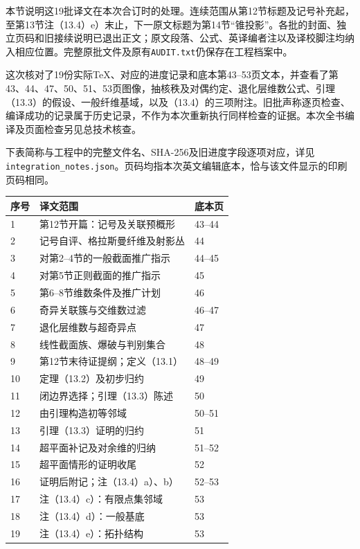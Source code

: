 本节说明这19批译文在本次合订时的处理。连续范围从第12节标题及记号补充起，至第13节注（13.4）e）末止，下一原文标题为第14节“锥投影”。各批的封面、独立页码和旧接续说明已退出正文；原文段落、公式、英译编者注以及译校脚注均纳入相应位置。完整原批文件及原有\texttt{AUDIT.txt}仍保存在工程档案中。

这次核对了19份实际TeX、对应的进度记录和底本第43--53页文本，并查看了第43、44、47、50、51、53页图像，抽核秩及对偶约定、退化层维数公式、引理（13.3）的假设、一般纤维基域，以及（13.4）的三项附注。旧批声称逐页检查、编译成功的记录属于历史记录，不作为本次重新执行同样检查的证据。本次全书编译及页面检查另见总技术核查。

下表简称与工程中的完整文件名、SHA-256及旧进度字段逐项对应，详见\texttt{integration\_notes.json}。页码均指本次英文编辑底本，恰与该文件显示的印刷页码相同。
\begin{longtable}{p{}p{}p{}}
\toprule 序号 & 译文范围 & 底本页 \\\midrule\endhead
1 & 第12节开篇：记号及关联预概形 & 43--44\\
2 & 记号自评、格拉斯曼纤维及射影丛 & 44\\
3 & 对第2--4节的一般截面推广指示 & 44--45\\
4 & 对第5节正则截面的推广指示 & 45\\
5 & 第6--8节维数条件及推广计划 & 46\\
6 & 奇异关联簇与交维数过滤 & 46--47\\
7 & 退化层维数与超奇异点 & 47\\
8 & 线性截面族、爆破与判别集合 & 48\\
9 & 第12节末待证提纲；定义（13.1） & 48--49\\
10 & 定理（13.2）及初步归约 & 49\\
11 & 闭边界选择；引理（13.3）陈述 & 50\\
12 & 由引理构造初等邻域 & 50--51\\
13 & 引理（13.3）证明的归约 & 51\\
14 & 超平面补记及对余维的归纳 & 51--52\\
15 & 超平面情形的证明收尾 & 52\\
16 & 证明后附记；注（13.4）a）、b） & 52--53\\
17 & 注（13.4）c）：有限点集邻域 & 53\\
18 & 注（13.4）d）：一般基底 & 53\\
19 & 注（13.4）e）：拓扑结构 & 53\\
\bottomrule
\end{longtable}

